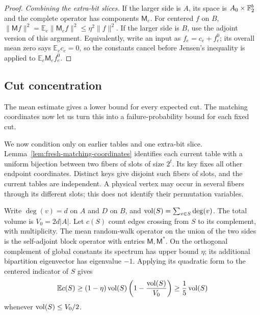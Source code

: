 \begin{proof}
\emph{Combining the extra-bit slices.}
If the larger side
is $A$, its space is $A_0\times\mathbb F_2^b$ and the complete operator
has components $\mathsf{M}_e$.  For centered $f$ on $B$,
$\|\mathsf{M}f\|^2=\mathbb E_e\|\mathsf{M}_ef\|^2\leq\eta^2\|f\|^2$.
If the larger side is $B$, use the adjoint version of this argument.
Equivalently, write an input as $f_e=c_e+f_e^0$; its overall mean
zero says $\mathbb E_ec_e=0$, so the constants cancel before
Jensen's inequality is applied to $\mathbb E_e\mathsf{M}_ef_e^0$.
\end{proof}

\subsection{Cut concentration}

The mean estimate gives a lower bound for every expected cut.  The
matching coordinates now let us turn this into a failure-probability
bound for each fixed cut.

We now condition only on earlier tables and one extra-bit slice.
Lemma~\ref{lem:fresh-matching-coordinates} identifies each current
table with a uniform bijection between two fibers of slots of size
$2^t$.  Its key fixes all other endpoint coordinates.  Distinct keys
give disjoint such fibers of slots, and the current tables are
independent.  A physical vertex may occur in several fibers through
its different slots; this does not identify their permutation
variables.

Write $\deg(v)=d$ on $A$ and $D$ on $B$, and
$\operatorname{vol}(S)=\sum_{v\in S}\deg(v)$.  The total volume is $V_0=2d|A|$.
Let $c(S)$ count edges crossing from $S$ to its complement, with
multiplicity.  The mean random-walk operator on the union of the
two sides is the self-adjoint block operator with entries $\mathsf{M},\mathsf{M}^*$.
On the orthogonal complement of global constants its spectrum has
upper bound $\eta$; its additional bipartition eigenvector has
eigenvalue $-1$.  Applying its quadratic form to the centered
indicator of $S$ gives
\begin{equation}\label{eq:expected-cut}
 \mathbb E c(S)\geq(1-\eta)\operatorname{vol}(S)
                  \left(1-\frac{\operatorname{vol}(S)}{V_0}\right)
               \geq\frac15\operatorname{vol}(S)
\end{equation}
whenever $\operatorname{vol}(S)\leq V_0/2$.

